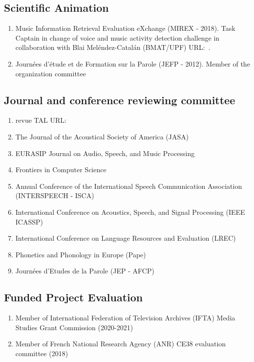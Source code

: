 \documentclass[a4paper,12pt]{article}
\newcommand{\myurl}[1]{URL:~\href{#1}{\faExternalLink*}}
\begin{document}
\subsection{Scientific Animation}
\begin{enumerate}
\item Music Information Retrieval Evaluation eXchange (MIREX - 2018). Task Captain in change of voice and music activity detection challenge in collaboration with Blai Meléndez-Catalán (BMAT/UPF) \myurl{https://www.music-ir.org/mirex/wiki/2018:Music_and/or_Speech_Detection}.
\item Journées d’étude et de Formation sur la Parole (JEFP - 2012). Member of the organization committee
\end{enumerate}
\subsection{Journal and conference reviewing committee}
\begin{enumerate}
\item revue TAL \myurl{https://www.atala.org/node/16}
\item The Journal of the Acoustical Society of America (JASA)
\item EURASIP Journal on Audio, Speech, and Music Processing
\item Frontiers in Computer Science
\item Annual Conference of the International Speech Communication Association (INTERSPEECH - ISCA)
\item International Conference on Acoustics, Speech, and Signal Processing (IEEE ICASSP)
\item International Conference on Language Resources and Evaluation (LREC)
\item Phonetics and Phonology in Europe (Pape)
\item Journées d’Etudes de la Parole (JEP - AFCP)
\end{enumerate}
\subsection{Funded Project Evaluation}
\begin{enumerate}
\item Member of International Federation of Television Archives (IFTA) Media Studies Grant Commission (2020-2021)
\item Member of French National Research Agency (ANR) CE38 evaluation committee (2018)
\end{enumerate}
\end{document}
